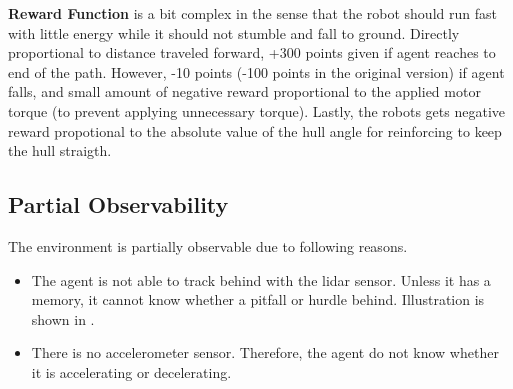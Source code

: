 \textbf{Reward Function} is a bit complex in the sense that the robot should run fast with little energy while it should not stumble and fall to ground. 
Directly proportional to distance traveled forward, +300 points given if agent reaches to end of the path. 
However, -10 points (-100 points in the original version) if agent falls, 
and small amount of negative reward proportional to the applied motor torque (to prevent applying unnecessary torque). 
Lastly, the robots gets negative reward propotional to the absolute value of the hull angle for reinforcing to keep the hull straigth. 

\subsection{Partial Observability}

The environment is partially observable due to following reasons.
\begin{itemize}
	\item The agent is not able to track behind with the lidar sensor. 
	Unless it has a memory, it cannot know whether a pitfall or hurdle behind. 
	Illustration is shown in .
	\item There is no accelerometer sensor. 
	Therefore, the agent do not know whether it is accelerating or decelerating.
\end{itemize}

